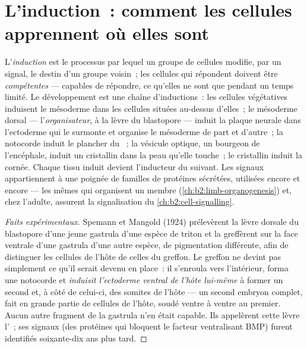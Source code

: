 \section{L'induction~: comment les cellules apprennent où elles sont}

\begin{definition}\label{def:b2:vertebrate-development:induction}
L'\emph{induction} est le processus par lequel un groupe de cellules
modifie, par un signal, le destin d'un groupe voisin~; les cellules qui
répondent doivent être \emph{compétentes} --- capables de répondre, ce
qu'elles ne sont que pendant un temps limité. Le développement est une
chaîne d'inductions~: les cellules végétatives induisent le mésoderme
dans les cellules situées au-dessus d'elles~; le mésoderme dorsal ---
l'\emph{organisateur}, à la lèvre du blastopore --- induit la plaque
neurale dans l'ectoderme qui le surmonte et organise le mésoderme de
part et d'autre~; la notocorde induit le plancher du ~; la
vésicule optique, un bourgeon de l'encéphale, induit un cristallin dans
la peau qu'elle touche~; le cristallin induit la cornée. Chaque tissu
induit devient l'inducteur du suivant. Les signaux appartiennent à une
poignée de familles de protéines sécrétées, utilisées encore et encore
--- les mêmes qui organisent un membre (\cref{ch:b2:limb-organogenesis})
et, chez l'adulte, assurent la signalisation du
\cref{ch:b2:cell-signalling}.
\end{definition}
\begin{proof}[Faits expérimentaux]
Spemann et Mangold (1924) prélevèrent la lèvre dorsale du blastopore
d'une jeune gastrula d'une espèce de triton et la greffèrent sur la face
ventrale d'une gastrula d'une autre espèce, de pigmentation différente,
afin de distinguer les cellules de l'hôte de celles du greffon. Le
greffon ne devint pas simplement ce qu'il serait devenu en place~: il
s'enroula vers l'intérieur, forma une notocorde et \emph{induisit
l'ectoderme ventral de l'hôte lui-même} à former un second 
et, à côté de celui-ci, des somites de l'hôte --- un second embryon
complet, fait en grande partie de cellules de l'hôte, soudé ventre à
ventre au premier. Aucun autre fragment de la gastrula n'en était
capable. Ils appelèrent cette lèvre l'~; ses signaux (des
protéines qui bloquent le facteur ventralisant BMP) furent identifiés
soixante-dix ans plus tard.
\end{proof}

